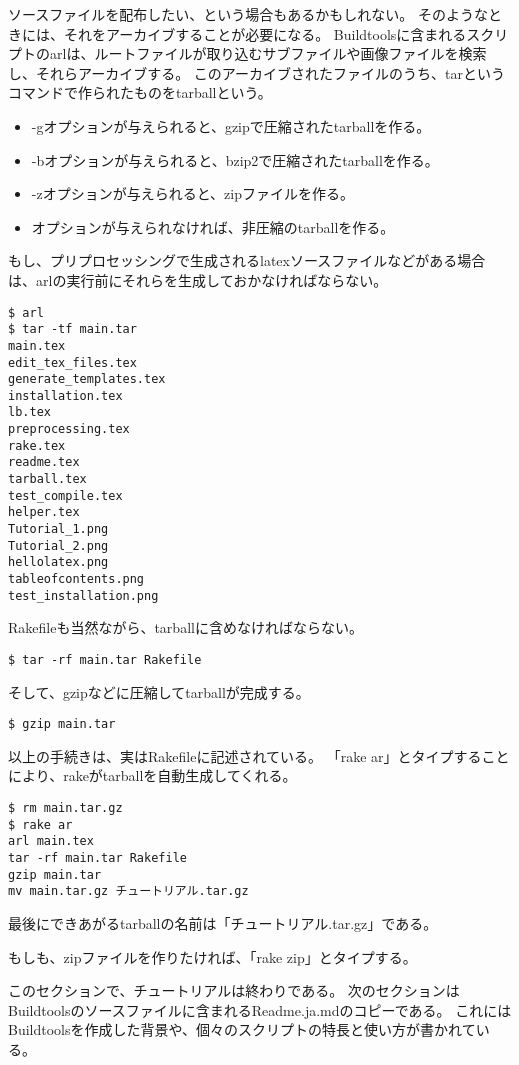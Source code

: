 ソースファイルを配布したい、という場合もあるかもしれない。
そのようなときには、それをアーカイブすることが必要になる。
Buildtoolsに含まれるスクリプトのarlは、ルートファイルが取り込むサブファイルや画像ファイルを検索し、それらアーカイブする。
このアーカイブされたファイルのうち、tarというコマンドで作られたものをtarballという。
\begin{itemize}
\item -gオプションが与えられると、gzipで圧縮されたtarballを作る。
\item -bオプションが与えられると、bzip2で圧縮されたtarballを作る。
\item -zオプションが与えられると、zipファイルを作る。
\item オプションが与えられなければ、非圧縮のtarballを作る。
\end{itemize}

もし、プリプロセッシングで生成されるlatexソースファイルなどがある場合は、arlの実行前にそれらを生成しておかなければならない。
\begin{verbatim}
$ arl
$ tar -tf main.tar
main.tex
edit_tex_files.tex
generate_templates.tex
installation.tex
lb.tex
preprocessing.tex
rake.tex
readme.tex
tarball.tex
test_compile.tex
helper.tex
Tutorial_1.png
Tutorial_2.png
hellolatex.png
tableofcontents.png
test_installation.png
\end{verbatim}

Rakefileも当然ながら、tarballに含めなければならない。
\begin{verbatim}
$ tar -rf main.tar Rakefile
\end{verbatim}
そして、gzipなどに圧縮してtarballが完成する。
\begin{verbatim}
$ gzip main.tar
\end{verbatim}

以上の手続きは、実はRakefileに記述されている。
「rake ar」とタイプすることにより、rakeがtarballを自動生成してくれる。
\begin{verbatim}
$ rm main.tar.gz
$ rake ar
arl main.tex
tar -rf main.tar Rakefile
gzip main.tar
mv main.tar.gz チュートリアル.tar.gz
\end{verbatim}
最後にできあがるtarballの名前は「チュートリアル.tar.gz」である。

もしも、zipファイルを作りたければ、「rake zip」とタイプする。

このセクションで、チュートリアルは終わりである。
次のセクションはBuildtoolsのソースファイルに含まれるReadme.ja.mdのコピーである。
これにはBuildtoolsを作成した背景や、個々のスクリプトの特長と使い方が書かれている。

